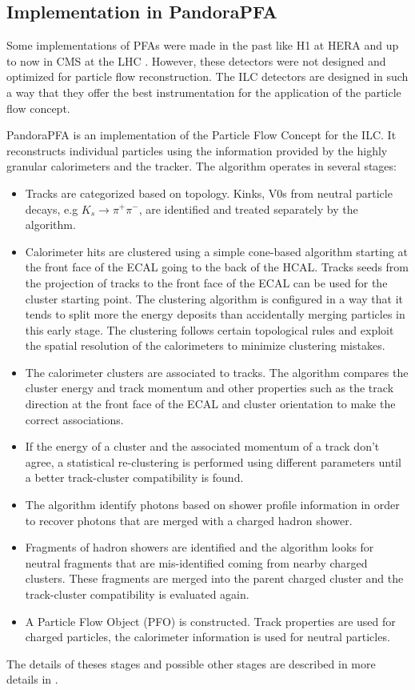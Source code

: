 \subsection{Implementation in PandoraPFA}

Some implementations of PFAs were made in the past like H1 at HERA \cite{Abt:1994ye} and up to now in CMS at the LHC \cite{Sirunyan:2017ulk}. However, these detectors were not designed and optimized for particle flow reconstruction. The ILC detectors are designed in such a way that they offer the best instrumentation for the application of the particle flow concept.

PandoraPFA \cite{Thomson:2009rp, Marshall2013} is an implementation of the Particle Flow Concept for the ILC. It reconstructs individual particles using the information provided by the highly granular calorimeters and the tracker. The algorithm operates in several stages:
\begin{itemize}
  \item Tracks are categorized based on topology. Kinks, V0s from neutral particle decays, e.g $K_s \rightarrow \pi^+\pi^-$, are identified and treated separately by the algorithm.
  \item Calorimeter hits are clustered using a simple cone-based algorithm starting at the front face of the ECAL going to the back of the HCAL. Tracks seeds from the projection of tracks to the front face of the ECAL can be used for the cluster starting point. The clustering algorithm is configured in a way that it tends to split more the energy deposits than accidentally merging particles in this early stage. The clustering follows certain topological rules and exploit the spatial resolution of the calorimeters to minimize clustering mistakes.
  \item The calorimeter clusters are associated to tracks. The algorithm compares the cluster energy and track momentum and other properties such as the track direction at the front face of the ECAL and cluster orientation to make the correct associations.
  \item If the energy of a cluster and the associated momentum of a track don't agree, a statistical re-clustering is performed using different parameters until a better track-cluster compatibility is found.
  \item The algorithm identify photons based on shower profile information in order to recover photons that are merged with a charged hadron shower.
  \item Fragments of hadron showers are identified and the algorithm looks for neutral fragments that are mis-identified coming from nearby charged clusters. These fragments are merged into the parent charged cluster and the track-cluster compatibility is evaluated again.
  \item A Particle Flow Object (PFO) is constructed. Track properties are used for charged particles, the calorimeter information is used for neutral particles.
\end{itemize}
The details of theses stages and possible other stages are described in more details in \cite{Thomson:2009rp}.

